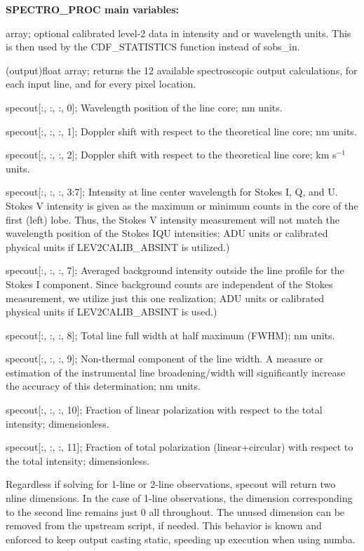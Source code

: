 \documentclass{article}
\begin{document}
\textbf{SPECTRO\_PROC main variables:}
\begin{description}
    [font=\normalfont,leftmargin=1.3in,style=multiline]

    \item[(opt.) sobs\_cal]
        [nx,ny,sn,4] array; optional calibrated level-2 data in intensity and or wavelength units. This is then used by the CDF\_STATISTICS function instead of sobs\_in.                 	
        \item[specout]
		[nx,ny,nline,12] (output)float array; returns the 12 available spectroscopic output calculations, for each input line, and for every pixel location.

		 
    \item[]
    		specout[:, :, :, 0]; Wavelength position of the line core; nm units.
    \item[]
    		specout[:, :, :, 1]; Doppler shift with respect to the theoretical line core; nm units.
    \item[]
        specout[:, :, :, 2]; Doppler shift with respect to the theoretical line core; km s$^{-1}$ units.
    \item[]
    		specout[:, :, :, 3:7]; Intensity at line center wavelength for Stokes I, Q, and U. Stokes V intensity is given as the maximum or minimum counts in the core of the first (left) lobe. Thus, the Stokes V intensity measurement will not match the wavelength position of the Stokes IQU intensities; ADU units or calibrated physical units if LEV2CALIB\_ABSINT is utilized.)
    \item[]
    		specout[:, :, :, 7]; Averaged background intensity outside the line profile for the Stokes I component. Since background counts are independent of the Stokes measurement, we utilize just this one realization; ADU units or calibrated physical units if LEV2CALIB\_ABSINT is used.)
    \item[]
    		specout[:, :, :, 8]; Total line full width at half maximum (FWHM); nm units.
    \item[]
    		specout[:, :, :, 9]; Non-thermal component of the line width. A measure or estimation of the instrumental line broadening/width will significantly increase the accuracy of this determination; nm units.

    \item[pl]
    		specout[:, :, :, 10]; Fraction of linear polarization with respect to the total intensity; dimensionless.                              
    \item[pv]
    		specout[:, :, :, 11];  Fraction of total polarization (linear+circular) with respect to the total intensity; dimensionless.
	\item[Note:]
		Regardless if solving for 1-line or 2-line observations, specout will return two nline dimensions. In the case of 1-line observations, the dimension corresponding to the second line remains just 0 all throughout. The unused dimension can be removed from the upstream script, if needed. This behavior is known and enforced to keep output casting static, speeding up execution when using numba.
\end{description}
\end{document}
